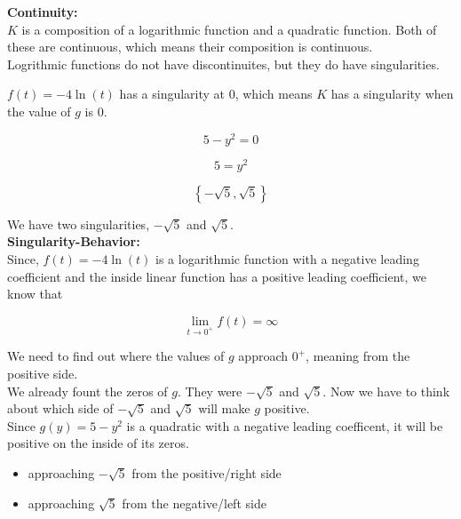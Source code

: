 \documentclass{ximera}
\begin{document}
\textbf{\textcolor{blue!55!black}{Continuity:}} \\


$K$ is a composition of a logarithmic function and a quadratic function.  Both of these are continuous, which means their composition is continuous. \\

Logrithmic functions do not have discontinuites, but they do have singularities.  


$f(t) = -4\ln(t)$ has a singularity at $0$, which means $K$ has a singularity when the value of $g$ is $0$.



\[
5 - y^2 = 0
\]



\[
5 = y^2
\]



\[
\left\{ -\sqrt{5}, \sqrt{5} \right\}
\]

We have two singularities, $-\sqrt{5}$ and $\sqrt{5}$. \\












\textbf{\textcolor{blue!55!black}{Singularity-Behavior:}} \\



Since, $f(t) = -4 \ln(t)$ is a logarithmic function with a negative leading coefficient and the inside linear function has a positive leading coefficient, we know that 


\[
\lim\limits_{t \to 0^+} f(t) = \infty
\]



We need to find out where the values of $g$ approach $0^+$, meaning from the positive side. \\


We already fount the zeros of $g$.  They were $-\sqrt{5}$ and $\sqrt{5}$.  Now we have to think about which side of $-\sqrt{5}$ and $\sqrt{5}$ will make $g$ positive. \\


Since $g(y) = 5 - y^2$ is a quadratic with a negative leading coefficent, it will be positive on the inside of its zeros. 

\begin{itemize}
\item approaching $-\sqrt{5}$ from the positive/right side
\item approaching $\sqrt{5}$ from the negative/left side
\end{itemize}
\end{document}
